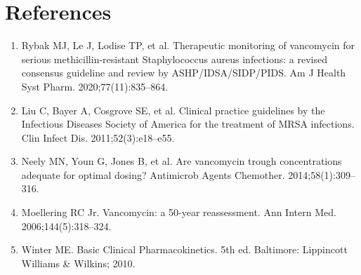 \section*{References}
\begin{enumerate}
  \item Rybak MJ, Le J, Lodise TP, et al. Therapeutic monitoring of vancomycin for serious methicillin-resistant Staphylococcus aureus infections: a revised consensus guideline and review by ASHP/IDSA/SIDP/PIDS. Am J Health Syst Pharm. 2020;77(11):835--864.
  \item Liu C, Bayer A, Cosgrove SE, et al. Clinical practice guidelines by the Infectious Diseases Society of America for the treatment of MRSA infections. Clin Infect Dis. 2011;52(3):e18--e55.
  \item Neely MN, Youn G, Jones B, et al. Are vancomycin trough concentrations adequate for optimal dosing? Antimicrob Agents Chemother. 2014;58(1):309--316.
  \item Moellering RC Jr. Vancomycin: a 50-year reassessment. Ann Intern Med. 2006;144(5):318--324.
  \item Winter ME. Basic Clinical Pharmacokinetics. 5th ed. Baltimore: Lippincott Williams \& Wilkins; 2010.
\end{enumerate}

\clearpage
